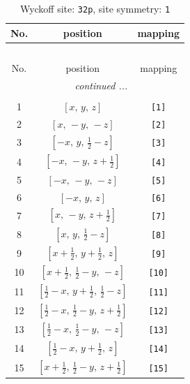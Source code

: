\documentclass[fleqn,8pt]{jsarticle}
\begin{document}
\renewcommand{\arraystretch}{1.2}
\begin{longtable}{ccc}
\caption{Wyckoff site: {\tt 32p}, site symmetry: {\tt 1}}
 \\
 \hline \hline
No. & position & mapping \\ \hline \endfirsthead

\multicolumn{2}{l}{\tablename\ \thetable{}} \\
 \hline \hline
No. & position & mapping \\ \hline \endhead

 \hline \hline
\multicolumn{2}{r}{\footnotesize\it continued ...} \\ \endfoot

 \hline \hline
\multicolumn{2}{r}{} \\ \endlastfoot

1 & $\left[ x,\, y,\, z \right]$ & {\tt [1]} \\ \hline
2 & $\left[ x,\, - y,\, - z \right]$ & {\tt [2]} \\ \hline
3 & $\left[ - x,\, y,\, \frac{1}{2} - z \right]$ & {\tt [3]} \\ \hline
4 & $\left[ - x,\, - y,\, z + \frac{1}{2} \right]$ & {\tt [4]} \\ \hline
5 & $\left[ - x,\, - y,\, - z \right]$ & {\tt [5]} \\ \hline
6 & $\left[ - x,\, y,\, z \right]$ & {\tt [6]} \\ \hline
7 & $\left[ x,\, - y,\, z + \frac{1}{2} \right]$ & {\tt [7]} \\ \hline
8 & $\left[ x,\, y,\, \frac{1}{2} - z \right]$ & {\tt [8]} \\ \hline
9 & $\left[ x + \frac{1}{2},\, y + \frac{1}{2},\, z \right]$ & {\tt [9]} \\ \hline
10 & $\left[ x + \frac{1}{2},\, \frac{1}{2} - y,\, - z \right]$ & {\tt [10]} \\ \hline
11 & $\left[ \frac{1}{2} - x,\, y + \frac{1}{2},\, \frac{1}{2} - z \right]$ & {\tt [11]} \\ \hline
12 & $\left[ \frac{1}{2} - x,\, \frac{1}{2} - y,\, z + \frac{1}{2} \right]$ & {\tt [12]} \\ \hline
13 & $\left[ \frac{1}{2} - x,\, \frac{1}{2} - y,\, - z \right]$ & {\tt [13]} \\ \hline
14 & $\left[ \frac{1}{2} - x,\, y + \frac{1}{2},\, z \right]$ & {\tt [14]} \\ \hline
15 & $\left[ x + \frac{1}{2},\, \frac{1}{2} - y,\, z + \frac{1}{2} \right]$ & {\tt [15]} \\ \hline

\end{longtable}
\end{document}
